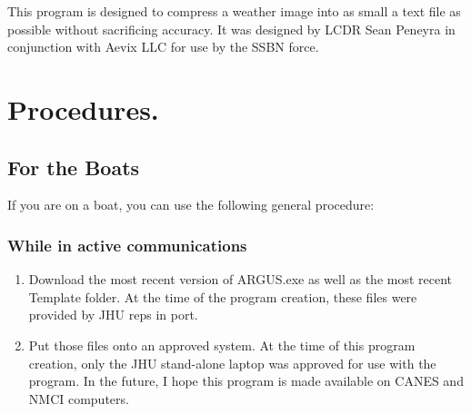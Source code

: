 This program is designed to compress a weather image into as small a text file as possible without sacrificing accuracy.  It was designed by LCDR Sean Peneyra in conjunction with Aevix LLC for use by the SSBN force.

\section{Procedures.}
\subsection{For the Boats}
If you are on a boat, you can use the following general procedure:

\subsubsection{While in active communications}
\begin{enumerate}
    \item Download the most recent version of ARGUS.exe as well as the most recent Template folder.  At the time of the program creation, these files were provided by JHU reps in port.
    \item Put those files onto an approved system.  At the time of this program creation, only the JHU stand-alone laptop was approved for use with the program.  In the future, I hope this program is made available on CANES and NMCI computers.
\end{enumerate}

